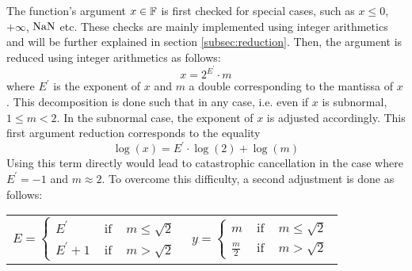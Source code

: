 The function's argument $x \in \mathbb {F}$ is first checked for special cases, such as $x\leq0$, $+\infty$, $\mathrm{NaN}$ etc.
These checks are mainly implemented using integer arithmetics and will be further explained in section
\ref{subsec:reduction}. Then, the argument is reduced using integer arithmetics as follows:
$$x = 2^{E^\prime} \cdot m$$
where $E^\prime$ is the exponent of $x$ and $m$ a double corresponding
to the mantissa of $x$. This decomposition is done such that in any
case, i.e. even if $x$ is subnormal, $1 \leq m < 2$. In the subnormal
case, the exponent of $x$ is adjusted accordingly.  This first
argument reduction corresponds to the equality
$$\log\left( x \right) = E^\prime \cdot \log\left(2\right) + \log\left(m \right)$$
Using this term directly would lead to catastrophic cancellation in the case where $E^\prime = -1$ and
$m \approx 2$. To overcome this difficulty, a second adjustment is done as follows:
\begin{center}
  \begin{tabular}{cc}
    \begin{minipage}{50mm}
      $$E = \left \lbrace \begin{array}{lcl} E^\prime & \mbox{ if } & m \leq \sqrt{2} \\
          E^\prime +1 & \mbox{ if } & m > \sqrt{2} \end{array} \right.$$
    \end{minipage}
    &
    \begin{minipage}{50mm}
      $$y = \left \lbrace \begin{array}{lcl} m & \mbox{ if } & m \leq \sqrt{2} \\
          \frac{m}{2} & \mbox{ if } & m > \sqrt{2} \end{array} \right.$$
    \end{minipage}
  \end{tabular}
\end{center} 

